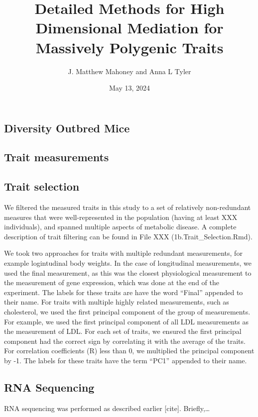 \documentclass[
]{article}
\title{Detailed Methods for High Dimensional Mediation for Massively
Polygenic Traits}
\author{J. Matthew Mahoney and Anna L Tyler}
\date{May 13, 2024}
\begin{document}
\maketitle

\subsection{Diversity Outbred Mice}\label{diversity-outbred-mice}

\subsection{Trait measurements}\label{trait-measurements}

\subsection{Trait selection}\label{trait-selection}

We filtered the measured traits in this study to a set of relatively
non-redundant measures that were well-represented in the population
(having at least XXX individuals), and spanned multiple aspects of
metabolic disease. A complete description of trait filtering can be
found in File XXX (1b.Trait\_Selection.Rmd).

We took two approaches for traits with multiple redundant measurements,
for example logintudinal body weights. In the case of longitudinal
measurements, we used the final measurement, as this was the closest
physiological measurement to the measurement of gene expression, which
was done at the end of the experiment. The labels for these traits are
have the word ``Final'' appended to their name. For traits with multiple
highly related measurements, such as cholesterol, we used the first
principal component of the group of measurements. For example, we used
the first principal component of all LDL measurements as the measurement
of LDL. For each set of traits, we ensured the first principal component
had the correct sign by correlating it with the average of the traits.
For correlation coefficients (R) less than 0, we multiplied the
principal component by -1. The labels for these traits have the term
``PC1'' appended to their name.

\subsection{RNA Sequencing}\label{rna-sequencing}

RNA sequencing was performed as described earlier {[}cite{]}.
Briefly,\ldots{}
\end{document}
